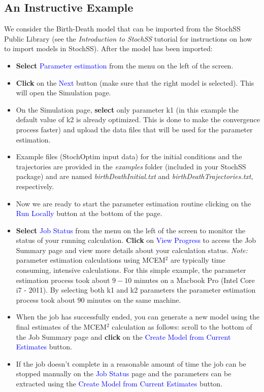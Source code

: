 \documentclass[12pt,notitlepage,nofootinbib]{revtex4}
\begin{document}
\subsection{An Instructive Example}
We consider the Birth-Death model that can be imported from the StochSS Public Library (see the \textit{Introduction to StochSS} tutorial for instructions on how to import models in StochSS).
After the model has been imported:
\begin{itemize}
\item \textbf{Select} \textcolor{blue}{Parameter estimation} from the menu on the left of the screen.
\item \textbf{Click} on the \textcolor{blue}{Next} button (make sure that the right model is selected). This will open the Simulation page.
\item On the Simulation page, \textbf{select} only parameter k1 (in this example the default value of k2 is already optimized. This is done to make the convergence process faster) and upload the data files that will be used for the parameter estimation.
\item Example files (StochOptim input data) for the initial conditions and the trajectories are provided in the \textit{examples} folder (included in your StochSS package) and are named \textit{birthDeathInitial.txt} and \textit{birthDeathTrajectories.txt}, respectively.
\item Now we are ready to start the parameter estimation routine clicking on the \textcolor{blue}{Run Locally} button at the bottom of the page. 
\item \textbf{Select} \textcolor{blue}{Job Status} from the menu on the left of the screen to monitor the status of your running calculation.
\textbf{Click} on  \textcolor{blue}{View Progress} to access the Job Summary page and view more details about your calculation status. \textit{Note:} parameter estimation calculations using MCEM$^2$ are typically time consuming, intensive calculations. For this simple example, the parameter estimation process took about $9-10$ minutes on a Macbook Pro (Intel Core i7 - 2011). By selecting both k1 and k2 parameters the parameter estimation process took about $90$ minutes on the same machine.

\item When the job has successfully ended, you can generate a new model using the final estimates of the MCEM$^2$ calculation as follows: scroll to the bottom of the Job Summary page and \textbf{click} on the \textcolor{blue}{Create Model from Current Estimates} button. 
\item If the job doesn't complete in a reasonable amount of time the job can be stopped manually on the \textcolor{blue}{Job Status} page and the parameters can be extracted using the \textcolor{blue}{Create Model from Current Estimates} button.
\end{itemize}
\end{document}
